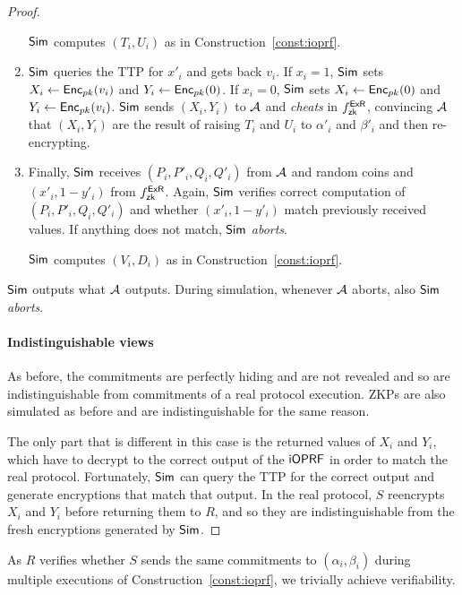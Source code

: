 \begin{proof}
\begin{enumerate}[leftmargin=*]
  ${\mathsf{Sim}}$ computes $(T_i,U_i)$ as in Construction~\ref{const:ioprf}.
  

\item ${\mathsf{Sim}}$ queries the TTP for $x'_i$ and gets back $v_i$. If
  $x_i=1$, ${\mathsf{Sim}}$ sets $X_i\leftarrow{\mathsf{Enc}}_{pk}(v_i)$ and
  $Y_i\leftarrow{\mathsf{Enc}}_{pk}(0)$.  If $x_i=0$, ${\mathsf{Sim}}$ sets
  $X_i\leftarrow{\mathsf{Enc}}_{pk}(0)$ and $Y_i\leftarrow{\mathsf{Enc}}_{pk}(v_i)$.
  ${\mathsf{Sim}}$ sends $(X_i,Y_i)$ to ${\mathcal{A}}$ and \emph{cheats} in ${f^{\mathsf{ExR}}_{\mathsf{zk}}}$,
  convincing ${\mathcal{A}}$ that $(X_i,Y_i)$ are the result of raising $T_i$ and
  $U_i$ to $\alpha'_i$ and $\beta'_i$ and then re-encrypting.
  

\item Finally, ${\mathsf{Sim}}$ receives $(P_i,P'_i,Q_i,Q'_i)$ from ${\mathcal{A}}$ and
  random coins and $(x'_i,1-y'_i)$ from ${f^{\mathsf{ExR}}_{\mathsf{zk}}}$. Again, ${\mathsf{Sim}}$
  verifies correct computation of $(P_i,P'_i,Q_i,Q'_i)$ and whether
  $(x'_i,1-y'_i)$ match previously received values. If anything does
  not match, ${\mathsf{Sim}}$ \emph{aborts}.

  ${\mathsf{Sim}}$ computes $(V_i,D_i)$ as in Construction~\ref{const:ioprf}.
  
\end{enumerate}
  ${\mathsf{Sim}}$ outputs what ${\mathcal{A}}$ outputs.
During simulation, whenever ${\mathcal{A}}$ aborts, also ${\mathsf{Sim}}$ \emph{aborts}.

\paragraph{Indistinguishable views} As before, the commitments are
perfectly hiding and are not revealed and so are indistinguishable
from commitments of a real protocol execution.  ZKPs are also
simulated as before and are indistinguishable for the same reason.

The only part that is different in this case is the returned values of
$X_i$ and $Y_i$, which have to decrypt to the correct output of the
$\mathsf{i}\mathsf{OPRF}$ in order to match the real protocol.  Fortunately, ${\mathsf{Sim}}$ can
query the TTP for the correct output and generate encryptions that
match that output.  In the real protocol, $S$ reencrypts $X_i$ and
$Y_i$ before returning them to $R$, and so they are indistinguishable
from the fresh encryptions generated by ${\mathsf{Sim}}$.
\end{proof}
As $R$ verifies whether $S$ sends the same commitments to
$(\alpha_i,\beta_i)$ during multiple executions of
Construction~\ref{const:ioprf}, we trivially achieve verifiability.

